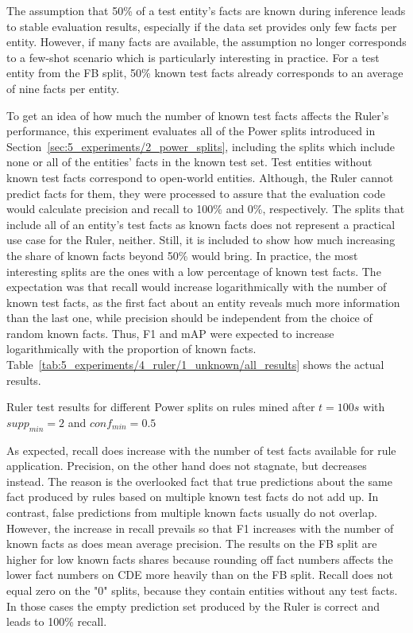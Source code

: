 The assumption that 50\% of a test entity's facts are known during inference leads to stable evaluation results, especially if the data set provides only few facts per entity. However, if many facts are available, the assumption no longer corresponds to a few-shot scenario which is particularly interesting in practice. For a test entity from the FB split, 50\% known test facts already corresponds to an average of nine facts per entity.

To get an idea of how much the number of known test facts affects the Ruler's performance, this experiment evaluates all of the Power splits introduced in Section~\ref{sec:5_experiments/2_power_splits}, including the splits which include none or all of the entities' facts in the known test set. Test entities without known test facts correspond to open-world entities. Although, the Ruler cannot predict facts for them, they were processed to assure that the evaluation code would calculate precision and recall to 100\% and 0\%, respectively. The splits that include all of an entity's test facts as known facts does not represent a practical use case for the Ruler, neither. Still, it is included to show how much increasing the share of known facts beyond 50\% would bring. In practice, the most interesting splits are the ones with a low percentage of known test facts. The expectation was that recall would increase logarithmically with the number of known test facts, as the first fact about an entity reveals much more information than the last one, while precision should be independent from the choice of random known facts. Thus, F1 and mAP were expected to increase logarithmically with the proportion of known facts. Table~\ref{tab:5_experiments/4_ruler/1_unknown/all_results} shows the actual results.

\begin{table}
    \centering
    
    \caption{Ruler test results for different Power splits on rules mined after $t = 100s$ with $supp_{min} = 2$ and $conf_{min} = 0.5$}
    \label{tab:5_experiments/4_ruler/1_unknown/all_results}
\end{table}

As expected, recall does increase with the number of test facts available for rule application. Precision, on the other hand does not stagnate, but decreases instead. The reason is the overlooked fact that true predictions about the same fact produced by rules based on multiple known test facts do not add up. In contrast, false predictions from multiple known facts usually do not overlap. However, the increase in recall prevails so that F1 increases with the number of known facts as does mean average precision. The results on the FB split are higher for low known facts shares because rounding off fact numbers affects the lower fact numbers on CDE more heavily than on the FB split. Recall does not equal zero on the "0" splits, because they contain entities without any test facts. In those cases the empty prediction set produced by the Ruler is correct and leads to 100\% recall.
